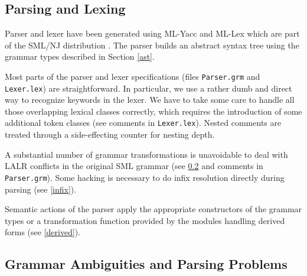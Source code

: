\documentclass[twoside,titlepage]{article}
\begin{document}
\subsection{Parsing and Lexing}
\label{parser}

Parser and lexer have been generated using ML-Yacc \cite{mlyacc} and ML-Lex \cite{mllex} which are part of the SML/NJ distribution \cite{smlnj}. The parser builds an abstract syntax tree using the grammar types described in Section \ref{ast}.

Most parts of the parser and lexer specifications (files {\tt Parser.grm} and {\tt Lexer.lex}) are straightforward. In particular, we use a rather dumb and direct way to recognize keywords in the lexer. We have to take some care to handle all those overlapping lexical classes correctly, which requires the introduction of some additional token classes (see comments in {\tt Lexer.lex}). Nested comments are treated through a side-effecting counter for nesting depth.

A substantial number of grammar transformations is unavoidable to deal with LALR conflicts in the original SML grammar (see \ref{ambiguities} and comments in {\tt Parser.grm}). Some hacking is necessary to do infix resolution directly during parsing (see \ref{infix}).

Semantic actions of the parser apply the appropriate constructors of the grammar types or a transformation function provided by the modules handling derived forms (see \ref{derived}).



\subsection{Grammar Ambiguities and Parsing Problems}
\label{ambiguities}
\end{document}
